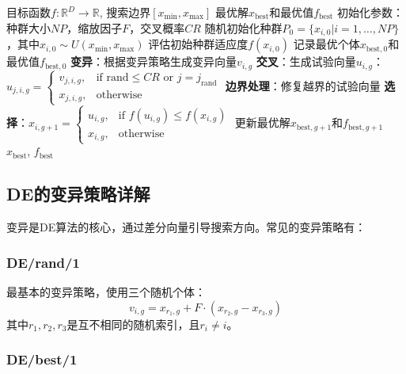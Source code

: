 \begin{algorithm}[H]
\caption{标准差分进化算法}
\begin{algorithmic}[1]
\REQUIRE 目标函数$f: \mathbb{R}^D \rightarrow \mathbb{R}$, 搜索边界$[x_{\min}, x_{\max}]$
\ENSURE 最优解$x_{\text{best}}$和最优值$f_{\text{best}}$
\STATE 初始化参数：种群大小$NP$，缩放因子$F$，交叉概率$CR$
\STATE 随机初始化种群$P_0 = \{x_{i,0} | i=1,\dots,NP\}$，其中$x_{i,0} \sim U(x_{\min}, x_{\max})$
\STATE 评估初始种群适应度$f(x_{i,0})$
\STATE 记录最优个体$x_{\text{best},0}$和最优值$f_{\text{best},0}$
        \STATE \textbf{变异}：根据变异策略生成变异向量$v_{i,g}$
        \STATE \textbf{交叉}：生成试验向量$u_{i,g}$：$u_{j,i,g} = 
        \begin{cases}
        v_{j,i,g}, & \text{if } \text{rand} \leq CR \text{ or } j = j_{\text{rand}} \\
        x_{j,i,g}, & \text{otherwise}
        \end{cases}$
        \STATE \textbf{边界处理}：修复越界的试验向量
        \STATE \textbf{选择}：$x_{i,g+1} = 
        \begin{cases}
        u_{i,g}, & \text{if } f(u_{i,g}) \leq f(x_{i,g}) \\
        x_{i,g}, & \text{otherwise}
        \end{cases}$
    \ENDFOR
    \STATE 更新最优解$x_{\text{best},g+1}$和$f_{\text{best},g+1}$
\ENDFOR
\RETURN $x_{\text{best}}$, $f_{\text{best}}$
\end{algorithmic}
\end{algorithm}

\subsection{DE的变异策略详解}

变异是DE算法的核心，通过差分向量引导搜索方向。常见的变异策略有：

\subsubsection{DE/rand/1}

最基本的变异策略，使用三个随机个体：
\[
v_{i,g} = x_{r_1,g} + F \cdot (x_{r_2,g} - x_{r_3,g})
\]
其中$r_1, r_2, r_3$是互不相同的随机索引，且$r_i \neq i$。

\subsubsection{DE/best/1}

